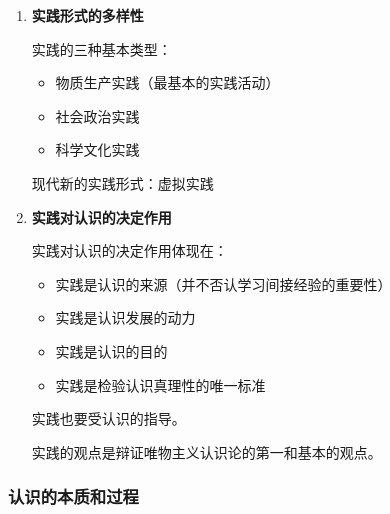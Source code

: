 \documentclass[12pt, a4paper, oneside]{ctexart}
\begin{document}
\begin{enumerate}
  \item {\bf 实践形式的多样性}
  
  实践的三种基本类型：
  \begin{itemize}
    \item 物质生产实践（最基本的实践活动）
    \item 社会政治实践
    \item 科学文化实践
  \end{itemize}

  现代新的实践形式：虚拟实践

  \item {\bf 实践对认识的决定作用}
  
  实践对认识的决定作用体现在：
  \begin{itemize}
    \item 实践是认识的来源（并不否认学习间接经验的重要性）
    \item 实践是认识发展的动力
    \item 实践是认识的目的
    \item 实践是检验认识真理性的唯一标准
  \end{itemize}

  实践也要受认识的指导。

  实践的观点是辩证唯物主义认识论的第一和基本的观点。
\end{enumerate}

\subsubsection{认识的本质和过程}
\end{document}
